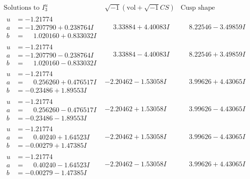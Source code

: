 \documentclass[1p]{elsarticle_modified}
\theoremstyle{definition}
\newcommand{\I}{\sqrt{-1}}
\begin{document}
$$\begin{array}{c|c|c}  
\text{Solutions to }I^u_{3}& \I (\text{vol} + \sqrt{-1}CS) & \text{Cusp shape}\\
 \hline 
\begin{aligned}
u &= -1.21774\phantom{ +0.000000I} \\
a &= -1.207790 + 0.238764 I \\
b &= \phantom{-}1.020160 + 0.833032 I\end{aligned}
 & \phantom{-}3.33884 + 4.40083 I & \phantom{-}8.22546 - 3.49859 I \\ \hline\begin{aligned}
u &= -1.21774\phantom{ +0.000000I} \\
a &= -1.207790 - 0.238764 I \\
b &= \phantom{-}1.020160 - 0.833032 I\end{aligned}
 & \phantom{-}3.33884 - 4.40083 I & \phantom{-}8.22546 + 3.49859 I \\ \hline\begin{aligned}
u &= -1.21774\phantom{ +0.000000I} \\
a &= \phantom{-}0.256260 + 0.476517 I \\
b &= -0.23486 + 1.89553 I\end{aligned}
 & -2.20462 - 1.53058 I & \phantom{-}3.99626 + 4.43065 I \\ \hline\begin{aligned}
u &= -1.21774\phantom{ +0.000000I} \\
a &= \phantom{-}0.256260 - 0.476517 I \\
b &= -0.23486 - 1.89553 I\end{aligned}
 & -2.20462 + 1.53058 I & \phantom{-}3.99626 - 4.43065 I \\ \hline\begin{aligned}
u &= -1.21774\phantom{ +0.000000I} \\
a &= \phantom{-}0.40240 + 1.64523 I \\
b &= -0.00279 + 1.47385 I\end{aligned}
 & -2.20462 + 1.53058 I & \phantom{-}3.99626 - 4.43065 I \\ \hline\begin{aligned}
u &= -1.21774\phantom{ +0.000000I} \\
a &= \phantom{-}0.40240 - 1.64523 I \\
b &= -0.00279 - 1.47385 I\end{aligned}
 & -2.20462 - 1.53058 I & \phantom{-}3.99626 + 4.43065 I \\ \hline\begin{aligned}

\end{aligned}
\end{array}$$
\end{document}

